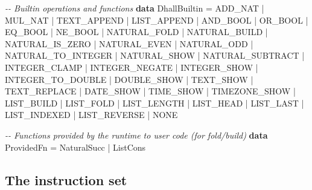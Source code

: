 \documentclass[]{article}
\newenvironment{Shaded}{}{}
\newcommand{\CommentTok}[1]{\textcolor[rgb]{0.38,0.63,0.69}{\textit{#1}}}
\newcommand{\DataTypeTok}[1]{\textcolor[rgb]{0.56,0.13,0.00}{#1}}
\newcommand{\KeywordTok}[1]{\textcolor[rgb]{0.00,0.44,0.13}{\textbf{#1}}}
\newcommand{\OperatorTok}[1]{\textcolor[rgb]{0.40,0.40,0.40}{#1}}
\newcommand{\OtherTok}[1]{\textcolor[rgb]{0.00,0.44,0.13}{#1}}
\begin{document}
\begin{Shaded}
\begin{Highlighting}[]
\CommentTok{{-}{-} Builtin operations and functions}
\KeywordTok{data} \DataTypeTok{DhallBuiltin}
    \OtherTok{=} \DataTypeTok{ADD\_NAT} \OperatorTok{|} \DataTypeTok{MUL\_NAT} \OperatorTok{|} \DataTypeTok{TEXT\_APPEND} \OperatorTok{|} \DataTypeTok{LIST\_APPEND}
    \OperatorTok{|} \DataTypeTok{AND\_BOOL} \OperatorTok{|} \DataTypeTok{OR\_BOOL} \OperatorTok{|} \DataTypeTok{EQ\_BOOL} \OperatorTok{|} \DataTypeTok{NE\_BOOL}
    \OperatorTok{|} \DataTypeTok{NATURAL\_FOLD} \OperatorTok{|} \DataTypeTok{NATURAL\_BUILD}
    \OperatorTok{|} \DataTypeTok{NATURAL\_IS\_ZERO} \OperatorTok{|} \DataTypeTok{NATURAL\_EVEN} \OperatorTok{|} \DataTypeTok{NATURAL\_ODD}
    \OperatorTok{|} \DataTypeTok{NATURAL\_TO\_INTEGER} \OperatorTok{|} \DataTypeTok{NATURAL\_SHOW} \OperatorTok{|} \DataTypeTok{NATURAL\_SUBTRACT}
    \OperatorTok{|} \DataTypeTok{INTEGER\_CLAMP} \OperatorTok{|} \DataTypeTok{INTEGER\_NEGATE} \OperatorTok{|} \DataTypeTok{INTEGER\_SHOW} \OperatorTok{|} \DataTypeTok{INTEGER\_TO\_DOUBLE}
    \OperatorTok{|} \DataTypeTok{DOUBLE\_SHOW} \OperatorTok{|} \DataTypeTok{TEXT\_SHOW} \OperatorTok{|} \DataTypeTok{TEXT\_REPLACE}
    \OperatorTok{|} \DataTypeTok{DATE\_SHOW} \OperatorTok{|} \DataTypeTok{TIME\_SHOW} \OperatorTok{|} \DataTypeTok{TIMEZONE\_SHOW}
    \OperatorTok{|} \DataTypeTok{LIST\_BUILD} \OperatorTok{|} \DataTypeTok{LIST\_FOLD}
    \OperatorTok{|} \DataTypeTok{LIST\_LENGTH} \OperatorTok{|} \DataTypeTok{LIST\_HEAD} \OperatorTok{|} \DataTypeTok{LIST\_LAST} \OperatorTok{|} \DataTypeTok{LIST\_INDEXED} \OperatorTok{|} \DataTypeTok{LIST\_REVERSE}
    \OperatorTok{|} \DataTypeTok{NONE}

\CommentTok{{-}{-} Functions provided by the runtime to user code (for fold/build)}
\KeywordTok{data} \DataTypeTok{ProvidedFn} \OtherTok{=} \DataTypeTok{NaturalSucc} \OperatorTok{|} \DataTypeTok{ListCons}
\end{Highlighting}
\end{Shaded}

\subsection{The instruction set}\label{the-instruction-set}
\end{document}
